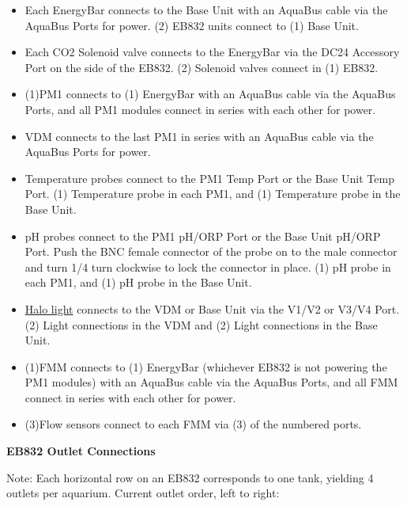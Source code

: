 \documentclass[]{book}
\providecommand{\tightlist}{%
  \setlength{\itemsep}{0pt}\setlength{\parskip}{0pt}}
\begin{document}
\begin{itemize}
\tightlist
\item
  Each EnergyBar connects to the Base Unit with an AquaBus cable via the
  AquaBus Ports for power. (2) EB832 units connect to (1) Base Unit.\\
\item
  Each CO2 Solenoid valve connects to the EnergyBar via the DC24
  Accessory Port on the side of the EB832. (2) Solenoid valves connect
  in (1) EB832.\\
\item
  (1)PM1 connects to (1) EnergyBar with an AquaBus cable via the AquaBus
  Ports, and all PM1 modules connect in series with each other for
  power.\\
\item
  VDM connects to the last PM1 in series with an AquaBus cable via the
  AquaBus Ports for power.\\
\item
  Temperature probes connect to the PM1 Temp Port or the Base Unit Temp
  Port. (1) Temperature probe in each PM1, and (1) Temperature probe in
  the Base Unit.\\
\item
  pH probes connect to the PM1 pH/ORP Port or the Base Unit pH/ORP Port.
  Push the BNC female connector of the probe on to the male connector
  and turn 1/4 turn clockwise to lock the connector in place. (1) pH
  probe in each PM1, and (1) pH probe in the Base Unit.\\
\item
  \href{https://github.com/SilbigerLab/Mesocosm_User_Manual/tree/394a3f7d9fed8765e4152f9fdd11d00a2ea87a93/Manuals/HALO_Quick_Start_Guide.pdf}{Halo
  light} connects to the VDM or Base Unit via the V1/V2 or V3/V4 Port.
  (2) Light connections in the VDM and (2) Light connections in the Base
  Unit.\\
\item
  (1)FMM connects to (1) EnergyBar (whichever EB832 is not powering the
  PM1 modules) with an AquaBus cable via the AquaBus Ports, and all FMM
  connect in series with each other for power.\\
\item
  (3)Flow sensors connect to each FMM via (3) of the numbered ports.
\end{itemize}

 \textbf{EB832 Outlet Connections}

Note: Each horizontal row on an EB832 corresponds to one tank, yielding
4 outlets per aquarium. Current outlet order, left to right:
\end{document}
